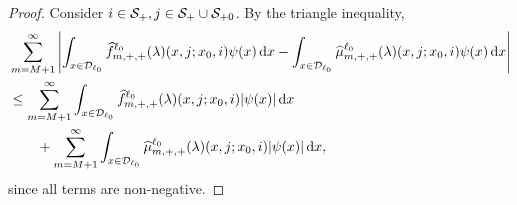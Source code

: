 \begin{proof}
	Consider \(i\in\mathcal{S}_+,j\in\mathcal S_+\cup\mathcal{S}_{+0}\). 
	By the triangle inequality, 
	\begin{align*}
		&\sum_{m=M+1}^\infty \left| \int_{x\in\mathcal{D}_{\ell_0}} \widehat f^{\ell_0}_{m,+,+}(\lambda)(x,j;x_0,i)\psi(x) \, \mathrm{d} x
		-
		 \int_{x\in\mathcal{D}_{\ell_0}} \widehat \mu^{\ell_0}_{m,+,+}(\lambda)(x,j;x_0,i) \psi(x) \, \mathrm{d} x \right|
		\\&\leq\sum_{m=M+1}^\infty \int_{x\in\mathcal{D}_{\ell_0}} \widehat f^{\ell_0}_{m,+,+}(\lambda)(x,j;x_0,i) |\psi(x)| \, \mathrm{d} x
		\\&\qquad{} +\sum_{m=M+1}^\infty \int_{x\in\mathcal{D}_{\ell_0}} \widehat  \mu^{\ell_0}_{m,+,+}(\lambda)(x,j;x_0,i) |\psi(x)| \, \mathrm{d} x,
	\end{align*}
	since all terms are non-negative. 
	

\end{proof}
